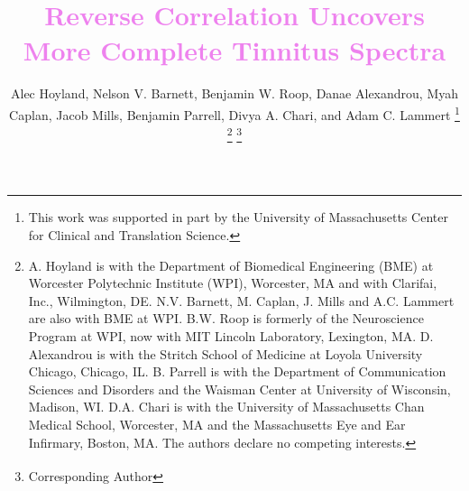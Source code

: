 \documentclass[journal]{IEEEtran}
\begin{document}
%
\title{\textcolor{violet}{Reverse Correlation Uncovers More Complete Tinnitus Spectra \vspace{0.25cm}}}

%
%
%

\author{Alec Hoyland, Nelson V. Barnett, Benjamin W. Roop, Danae Alexandrou, Myah Caplan, Jacob Mills, Benjamin Parrell, Divya A. Chari, and Adam C. Lammert\textsuperscript{\textdagger{}}%
\thanks{This work was supported in part by the University of Massachusetts
Center for Clinical and Translation Science.}%
\thanks{A. Hoyland is with the Department of Biomedical Engineering (BME)
at Worcester Polytechnic Institute (WPI), Worcester, MA and with Clarifai, Inc., Wilmington, DE.
N.V. Barnett, M. Caplan, J. Mills and A.C. Lammert are also with BME at WPI.
B.W. Roop is formerly of the Neuroscience Program at WPI, now with  MIT Lincoln Laboratory, Lexington, MA.
D. Alexandrou is with the Stritch School of Medicine at Loyola University Chicago, Chicago, IL.
B. Parrell is with the Department of Communication Sciences and Disorders and the Waisman Center at University of Wisconsin, Madison, WI. D.A. Chari is with the
University of Massachusetts Chan Medical School, Worcester, MA
and the Massachusetts Eye and Ear Infirmary,
Boston, MA.
The authors declare no competing interests.}%
\thanks{\textsuperscript{\textdagger{}} Corresponding Author}}%

% 
%
\end{document}

